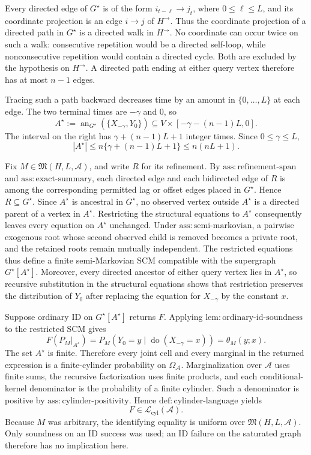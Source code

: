 Every directed edge of \(G^\star\) is of the form \(i_{t-\ell}\to j_t\), where \(0\leq\ell\leq L\), and its coordinate projection is an edge \(i\to j\) of \(H^{\to}\).  Thus the coordinate projection of a directed path in \(G^\star\) is a directed walk in \(H^{\to}\).  No coordinate can occur twice on such a walk: consecutive repetition would be a directed self-loop, while nonconsecutive repetition would contain a directed cycle.  Both are excluded by the hypothesis on \(H^{\to}\).  A directed path ending at either query vertex therefore has at most \(n-1\) edges.

Tracing such a path backward decreases time by an amount in \(\{0,\ldots,L\}\) at each edge.  The two terminal times are \(-\gamma\) and \(0\), so
\[
 A^\star:=\operatorname{an}_{G^\star}(\{X_{-\gamma},Y_0\})
 \subseteq V\times[-\gamma-(n-1)L,0].
\]
The interval on the right has \(\gamma+(n-1)L+1\) integer times.  Since \(0\leq\gamma\leq L\),
\[
 |A^\star|
 \leq n\{\gamma+(n-1)L+1\}
 \leq n(nL+1).
\]

Fix \(M\in\mathfrak M(H,L,\mathcal A)\), and write \(R\) for its refinement.  By \(\mathrm{ass:refinement\text{-}span}\) and \(\mathrm{ass:exact\text{-}summary}\), each directed edge and each bidirected edge of \(R\) is among the corresponding permitted lag or offset edges placed in \(G^\star\).  Hence \(R\subseteq G^\star\).  Since \(A^\star\) is ancestral in \(G^\star\), no observed vertex outside \(A^\star\) is a directed parent of a vertex in \(A^\star\).  Restricting the structural equations to \(A^\star\) consequently leaves every equation on \(A^\star\) unchanged.  Under \(\mathrm{ass:semi\text{-}markovian}\), a pairwise exogenous root whose second observed child is removed becomes a private root, and the retained roots remain mutually independent.  The restricted equations thus define a finite semi-Markovian SCM compatible with the supergraph \(G^\star[A^\star]\).  Moreover, every directed ancestor of either query vertex lies in \(A^\star\), so recursive substitution in the structural equations shows that restriction preserves the distribution of \(Y_0\) after replacing the equation for \(X_{-\gamma}\) by the constant \(x\).

Suppose ordinary ID on \(G^\star[A^\star]\) returns \(F\).  Applying \(\mathrm{lem:ordinary\text{-}id\text{-}soundness}\) to the restricted SCM gives
\[
 F(P_M|_{A^\star})
 =P_M(Y_0=y\mid\operatorname{do}(X_{-\gamma}=x))
 =\theta_M(y;x).
\]
The set \(A^\star\) is finite.  Therefore every joint cell and every marginal in the returned expression is a finite-cylinder probability on \(\Omega_{\mathcal A}\).  Marginalization over \(\mathcal A\) uses finite sums, the recursive factorization uses finite products, and each conditional-kernel denominator is the probability of a finite cylinder.  Such a denominator is positive by \(\mathrm{ass:cylinder\text{-}positivity}\).  Hence \(\mathrm{def:cylinder\text{-}language}\) yields
\[
 F\in\mathcal L_{\mathrm{cyl}}(\mathcal A).
\]
Because \(M\) was arbitrary, the identifying equality is uniform over \(\mathfrak M(H,L,\mathcal A)\).  Only soundness on an ID success was used; an ID failure on the saturated graph therefore has no implication here.

